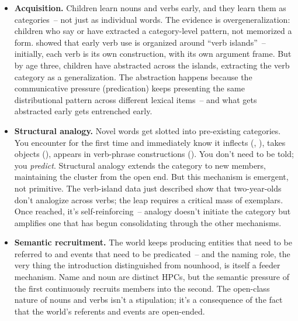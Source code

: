 \begin{itemize}
    \item \textbf{Acquisition.} Children learn nouns and verbs early, and they learn them as categories~-- not just as individual words. The evidence is overgeneralization: children who say  or  have extracted a category-level pattern, not memorized a form. \textcite{tomasello1992} showed that early verb use is organized around \enquote{verb islands}~-- initially, each verb is its own construction, with its own argument frame. But by age three, children have abstracted across the islands, extracting the verb category as a generalization. The abstraction happens because the communicative pressure (predication) keeps presenting the same distributional pattern across different lexical items~-- and what gets abstracted early gets entrenched early.
    \item \textbf{Structural analogy.} Novel words get slotted into pre-existing categories. You encounter  for the first time and immediately know it inflects (, ), takes objects (), appears in verb-phrase constructions (). You don't need to be told; you \emph{predict}. Structural analogy extends the category to new members, maintaining the cluster from the open end. But this mechanism is emergent, not primitive. The verb-island data just described show that two-year-olds don't analogize across verbs; the leap requires a critical mass of exemplars. Once reached, it's self-reinforcing~-- analogy doesn't initiate the category but amplifies one that has begun consolidating through the other mechanisms.
    \item \textbf{Semantic recruitment.} The world keeps producing entities that need to be referred to and events that need to be predicated~-- and the naming role, the very thing the introduction distinguished from nounhood, is itself a feeder mechanism. Name and noun are distinct HPCs, but the semantic pressure of the first continuously recruits members into the second. The open-class nature of nouns and verbs isn't a stipulation; it's a consequence of the fact that the world's referents and events are open-ended.
\end{itemize}

